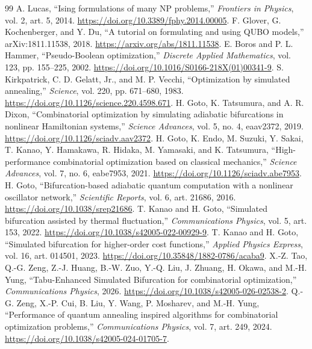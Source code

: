 \documentclass[11pt,a4paper]{article}
\begin{document}
\begin{thebibliography}{99}\small\setlength{\itemsep}{3pt}
 A. Lucas, ``Ising formulations of many NP problems,'' \textit{Frontiers in Physics}, vol. 2, art. 5, 2014. \url{https://doi.org/10.3389/fphy.2014.00005}.
 F. Glover, G. Kochenberger, and Y. Du, ``A tutorial on formulating and using QUBO models,'' arXiv:1811.11538, 2018. \url{https://arxiv.org/abs/1811.11538}.
 E. Boros and P. L. Hammer, ``Pseudo-Boolean optimization,'' \textit{Discrete Applied Mathematics}, vol. 123, pp. 155--225, 2002. \url{https://doi.org/10.1016/S0166-218X(01)00341-9}.
 S. Kirkpatrick, C. D. Gelatt, Jr., and M. P. Vecchi, ``Optimization by simulated annealing,'' \textit{Science}, vol. 220, pp. 671--680, 1983. \url{https://doi.org/10.1126/science.220.4598.671}.
 H. Goto, K. Tatsumura, and A. R. Dixon, ``Combinatorial optimization by simulating adiabatic bifurcations in nonlinear Hamiltonian systems,'' \textit{Science Advances}, vol. 5, no. 4, eaav2372, 2019. \url{https://doi.org/10.1126/sciadv.aav2372}.
 H. Goto, K. Endo, M. Suzuki, Y. Sakai, T. Kanao, Y. Hamakawa, R. Hidaka, M. Yamasaki, and K. Tatsumura, ``High-performance combinatorial optimization based on classical mechanics,'' \textit{Science Advances}, vol. 7, no. 6, eabe7953, 2021. \url{https://doi.org/10.1126/sciadv.abe7953}.
 H. Goto, ``Bifurcation-based adiabatic quantum computation with a nonlinear oscillator network,'' \textit{Scientific Reports}, vol. 6, art. 21686, 2016. \url{https://doi.org/10.1038/srep21686}.
 T. Kanao and H. Goto, ``Simulated bifurcation assisted by thermal fluctuation,'' \textit{Communications Physics}, vol. 5, art. 153, 2022. \url{https://doi.org/10.1038/s42005-022-00929-9}.
 T. Kanao and H. Goto, ``Simulated bifurcation for higher-order cost functions,'' \textit{Applied Physics Express}, vol. 16, art. 014501, 2023. \url{https://doi.org/10.35848/1882-0786/acaba9}.
 X.-Z. Tao, Q.-G. Zeng, Z.-J. Huang, B.-W. Zuo, Y.-Q. Liu, J. Zhuang, H. Okawa, and M.-H. Yung, ``Tabu-Enhanced Simulated Bifurcation for combinatorial optimization,'' \textit{Communications Physics}, 2026. \url{https://doi.org/10.1038/s42005-026-02538-2}.
 Q.-G. Zeng, X.-P. Cui, B. Liu, Y. Wang, P. Mosharev, and M.-H. Yung, ``Performance of quantum annealing inspired algorithms for combinatorial optimization problems,'' \textit{Communications Physics}, vol. 7, art. 249, 2024. \url{https://doi.org/10.1038/s42005-024-01705-7}.

\end{thebibliography}
\end{document}
